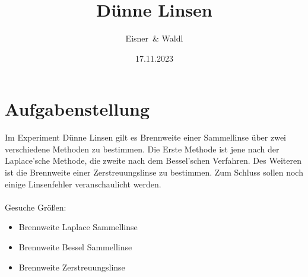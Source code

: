\documentclass[12pt,a4paper,twoside]{article}
\begin{document}
\newcommand\laboratorynumber{2}
\title{Dünne Linsen}
\newcommand\supervisor{Ditlbacher, Harald}
\newcommand\groupnumber{42}

\newcommand\participantonelastname{Eisner}
\newcommand\participantonefirstname{Nico}
\newcommand\participantoneid{12214121}
\newcommand\participanttwolastname{Waldl}
\newcommand\participanttwofirstname{Philip}
\newcommand\participanttwoid{12214120}
\author{\participantonelastname \ \& \participanttwolastname}

\newcommand\degreeid{UB 033 678}
\newcommand\semester{23WS}
\date{17.11.2023}

\newcommand\coursetitle{Laborübungen 2: \\ Elektrizität, Magnetismus, Optik}

%



\tableofcontents
\newpage

\section{Aufgabenstellung} %
Im Experiment Dünne Linsen gilt es Brennweite einer Sammellinse über zwei verschiedene Methoden zu bestimmen. 
Die Erste Methode ist jene nach der Laplace'sche Methode, die zweite nach dem Bessel'schen Verfahren. 
Des Weiteren ist die Brennweite einer Zerstreuungslinse zu bestimmen. 
Zum Schluss sollen noch einige Linsenfehler veranschaulicht werden. 
\\
\\
Gesuche Größen: 
\begin{itemize}
    \item Brennweite Laplace Sammellinse
    \item Brennweite Bessel Sammellinse
    \item Brennweite Zerstreuungslinse
\end{itemize}
\end{document}
